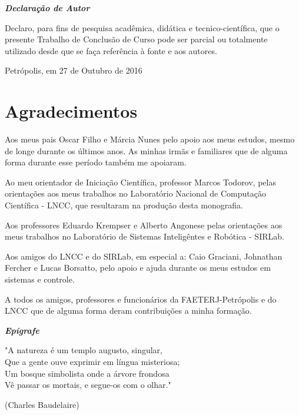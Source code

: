 \documentclass[brazil,ruledheader]{abntifes}
\newcommand{\AUTOR}{Bernardo Barbosa de Araujo}
\newcommand{\DATA}{27 de Outubro de 2016}
\begin{document}
\vfill 
\null
\begin{center}
{\Huge {\bfseries\itshape Declaração de Autor}}\\[3cm]
\begin{espacoduplo}
Declaro, para fins de pesquisa acadêmica, didática e tecnico-científica, que o presente Trabalho de Conclusão
de Curso pode ser parcial ou totalmente utilizado desde que se faça referência à fonte e aos autores.
\end{espacoduplo}
\setlength{\ABNTsignthickness}{0.4pt}
\assinatura{\AUTOR}
Petrópolis, em \DATA
\end{center}


\chapter*{Agradecimentos}
Aos meus pais Oscar Filho e Márcia Nunes pelo apoio aos meus estudos, mesmo de longe durante os últimos anos. As minhas irmãs e familiares que de alguma forma durante esse período também me apoiaram.

Ao meu orientador de Iniciação Científica, professor Marcos Todorov, pelas orientações aos meus trabalhos no Laboratório Nacional de Computação Científica - LNCC, que resultaram na produção desta monografia.

Aos professores Eduardo Krempser e Alberto Angonese pelas orientações aos meus trabalhos no Laboratório de Sistemas Inteligêntes e Robótica - SIRLab.

Aos amigos do LNCC e do SIRLab, em especial a: Caio Graciani, Johnathan Fercher e Lucas Borsatto, pelo apoio e ajuda durante os meus estudos em sistemas e controle.

A todos os amigos, professores e funcionários da FAETERJ-Petrópolis e do LNCC que de alguma forma deram contribuições a minha formação. 
\vfill 
\null

\vspace{10cm}
\begin{center}
{\Huge {\bfseries\itshape Epígrafe}}\\[3cm]
\vspace{10cm}
\end{center}



\epigraph{"A natureza é um templo augusto, singular,\\ 
		Que a gente ouve exprimir em língua misteriosa;\\
		Um bosque simbolista onde a árvore frondosa\\
		Vê passar os mortais, e segue-os com o olhar."}{(Charles Baudelaire)}
\end{document}
